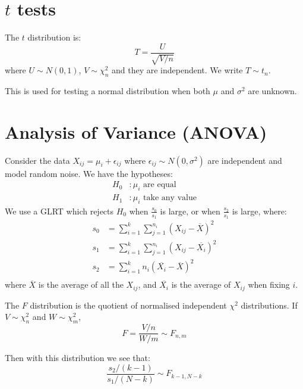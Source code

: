 \documentclass[../Main.tex]{subfiles}
\begin{document}
\section{\texorpdfstring{$t$}{T} tests}
The $t$ distribution is:
\begin{equation*}
    T = \frac{U}{\sqrt{V / n}}
\end{equation*}
where $U \sim N(0, 1)$, $V \sim \chi_n^2$ and they are independent. We write $T \sim t_n$.

This is used for testing a normal distribution when both $\mu$ and $\sigma^2$ are unknown.
\section{Analysis of Variance (ANOVA)}
Consider the data $X_{ij} = \mu_i + \epsilon_{ij}$ where $\epsilon_{ij} \sim N(0, \sigma^2)$ are independent and model random noise. We have the hypotheses:
\begin{align*}
    H_0&: \text{$\mu_i$ are equal} \\
    H_1&: \text{$\mu_i$ take any value}
\end{align*}
We use a GLRT which rejects $H_0$ when $\frac{s_0}{s_1}$ is large, or when $\frac{s_2}{s_1}$ is large, where:
\begin{align*}
    s_0&= \sum_{i=1}^{k} \sum_{j=1}^{n_i} (X_{ij} - \overline{X})^2 \\
    s_1&= \sum_{i=1}^{k} \sum_{j=1}^{n_i} (X_{ij} - \overline{X_i})^2 \\
    s_2&= \sum_{i=1}^{k} n_i (\overline{X_i} - \overline{X})^2 \\
\end{align*}
where $\overline{X}$ is the average of all the $X_{ij}$, and $\overline{X_i}$ is the average of $X_{ij}$ when fixing $i$.

The $F$ distribution is the quotient of normalised independent $\chi^2$ distributions. If $V \sim \chi_n^2$ and $W \sim \chi_m^2$,
\begin{equation*}
    F = \frac{V / n}{W / m} \sim F_{n, m}
\end{equation*}

Then with this distribution we see that:
\begin{equation*}
    \frac{s_2 / (k - 1)}{s_1 / (N - k)} \sim F_{k-1, N-k}
\end{equation*}
\end{document}
